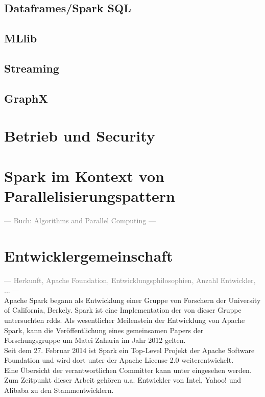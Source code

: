 \subsection{Dataframes/Spark SQL}


\subsection{MLlib}
\subsection{Streaming}
\subsection{GraphX}

\section{Betrieb und Security}

\section{Spark im Kontext von Parallelisierungspattern}
\textcolor{gray}{--- Buch: Algorithms and Parallel Computing ---}\\

\section{Entwicklergemeinschaft}
\textcolor{gray}{--- Herkunft, Apache Foundation, Entwicklungsphilosophien, Anzahl Entwickler, ... ---}\\

Apache Spark begann als Entwicklung einer Gruppe von Forschern der University of California, Berkely. Spark ist eine Implementation der von dieser Gruppe untersuchten \glspl{rdd}\cite{Mat12}. Als wesentlicher Meilenstein der Entwicklung von Apache Spark, kann die Veröffentlichung eines gemeinsamen Papers der Forschungsgruppe um Matei Zaharia im Jahr 2012 gelten.\\

Seit dem 27. Februar 2014\cite{apacheblog} ist Spark ein Top-Level Projekt der Apache Software Foundation\cite{apache} und wird dort unter der Apache License 2.0\cite{apachelic} weiterentwickelt.\\

Eine Übersicht der verantwortlichen Committer kann unter \cite{committer} eingesehen werden.
Zum Zeitpunkt dieser Arbeit gehören u.a. Entwickler von Intel, Yahoo! und Alibaba zu den Stammentwicklern.\\

